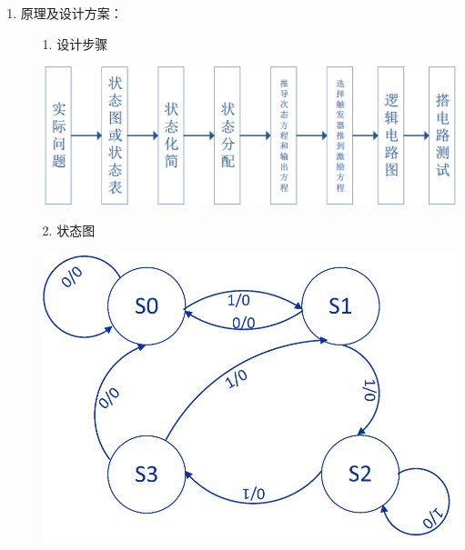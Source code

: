 \documentclass[UTF8]{ctexart}
\begin{document}
\begin{enumerate}
    \large
    \vspace{1\baselineskip}
    \item 原理及设计方案：  \\
          \begin{itemize}
              \item [1.] 设计步骤 \\
                    \begin{center}
                        \includegraphics[scale=0.6]{1.png}
                    \end{center}

              \item [2.] 状态图 \\
                    \begin{center}
                        \includegraphics[scale = 0.6]{2.png}
                    \end{center}


\end{itemize}
\end{enumerate}
\end{document}
